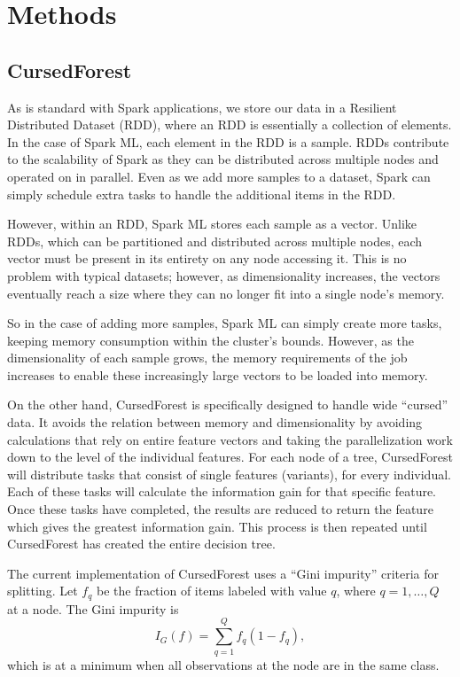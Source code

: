 \documentclass[a4paper]{amsart}
\begin{document}
\section{Methods}
\subsection{CursedForest}
As is standard with Spark applications, we store our data in a Resilient Distributed Dataset (RDD), where an RDD is
essentially a collection of elements. In the case of Spark ML, each element in the RDD is a sample. RDDs contribute to
the scalability of Spark as they can be distributed across multiple nodes and operated on in parallel. Even as we add more
samples to a dataset, Spark can simply schedule extra tasks to handle the additional items in the RDD.

However, within an RDD, Spark ML stores each sample as a vector. Unlike RDDs, which can be partitioned and distributed
across multiple nodes, each vector must be present in its entirety on any node accessing it. This is no problem with
typical datasets; however, as dimensionality increases, the vectors eventually reach a size where they can no longer fit
into a single node's memory.

So in the case of adding more samples, Spark ML can simply create more tasks, keeping memory consumption within the
cluster's bounds. However, as the dimensionality of each sample grows, the memory requirements of the job increases to
enable these increasingly large vectors to be loaded into memory.  

On the other hand, CursedForest is specifically designed to handle wide ``cursed'' data. It avoids the relation between
memory and dimensionality by avoiding calculations that rely on entire feature vectors and taking the parallelization
work down to the level of the individual features.  For each node of a tree, CursedForest will distribute
tasks that consist of single features (variants), for every individual.  Each of these tasks will calculate the
information gain for that specific feature.  Once these tasks have completed, the results are reduced to return the
feature which gives the greatest information gain.  This process is then repeated until CursedForest has created the
entire decision tree.

The current implementation of CursedForest uses a ``Gini impurity'' criteria for splitting. Let $f_q$ be the fraction
of items labeled with value $q$, where $q = 1, \ldots, Q$ at a node. The Gini impurity is
$$
I_G(f) = \sum_{q = 1}^Q f_q ( 1 - f_q ), 
$$
which is at a minimum when all observations at the node are in the same class.
\end{document}
